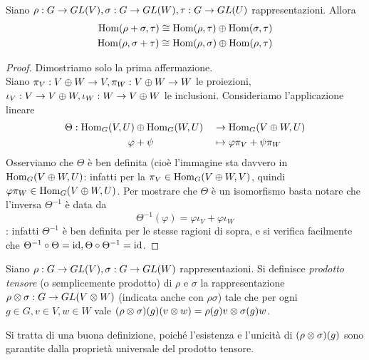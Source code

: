 \begin{proposition}
Siano $\rho:G\to GL(V),\allowbreak\sigma:G\to GL(W),\allowbreak\tau:G\to GL(U)$ rappresentazioni. Allora
\begin{align*}
\operatorname{Hom}(\rho+\sigma,\tau)\cong\operatorname{Hom}(\rho,\tau)\oplus\operatorname{Hom}(\sigma,\tau)\\
\operatorname{Hom}(\rho,\sigma+\tau)\cong\operatorname{Hom}(\rho,\sigma)\oplus\operatorname{Hom}(\rho,\tau)
\end{align*}
\end{proposition}
\begin{proof}
Dimostriamo solo la prima affermazione.\\
Siano $\pi_V:V\oplus W\to V,\allowbreak\pi_W:V\oplus W\to W$ le proiezioni, $\iota_V:V\to V\oplus W,\allowbreak\iota_W:W\to V\oplus W$ le inclusioni. Consideriamo l'applicazione lineare
\begin{alignat*}{2}
\Theta:\operatorname{Hom}_G(V,U)&\oplus\operatorname{Hom}_G(W,U)&&\to\operatorname{Hom}_G(V\oplus W,U)\\
\varphi&+\psi&&\mapsto\varphi\pi_V+\psi\pi_W
\end{alignat*}
Osserviamo che $\Theta$ è ben definita (cioè l'immagine sta davvero in $\operatorname{Hom}_G(V\oplus W,U)$: infatti per la  $\pi_V\in\operatorname{Hom}_G(V\oplus W,V)$, quindi $\varphi\pi_W\in\operatorname{Hom}_G(V\oplus W,U)$. Per mostrare che $\Theta$ è un isomorfismo basta notare che l'inversa $\Theta^{-1}$ è data da
$$
\Theta^{-1}(\varphi)=\varphi\iota_V+\varphi\iota_W
$$
: infatti $\Theta^{-1}$ è ben definita per le stesse ragioni di sopra, e si verifica facilmente che $\Theta^{-1}\circ\Theta=\operatorname{id},\allowbreak\Theta\circ\Theta^{-1}=\operatorname{id}$.
\end{proof}

\begin{definition}
Siano $\rho:G\to GL(V),\allowbreak\sigma:G\to GL(W)$ rappresentazioni. Si definisce \emph{prodotto tensore} (o semplicemente prodotto) di $\rho$ e $\sigma$ la rappresentazione $\rho\otimes\sigma:G\to GL(V\otimes W)$ (indicata anche con $\rho\sigma$) tale che per ogni $g\in G\comma v\in V\comma w\in W$ vale $(\rho\otimes\sigma)(g)(v\otimes w)=\rho(g)v\otimes\sigma(g)w$.
\end{definition}
\begin{remark}
Si tratta di una buona definizione, poiché l'esistenza e l'unicità di $(\rho\otimes\sigma)(g)$ sono garantite dalla proprietà universale del prodotto tensore.
\end{remark}

